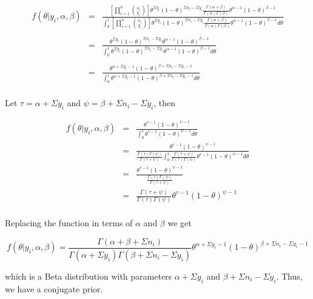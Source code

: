 \documentclass[12pt]{article}
\begin{document}
\begin{eqnarray*}
f(\theta|y_i,\alpha,\beta) &=& \frac{\left[\prod_{i=1}^n{n_i \choose y_i}\right]\theta^{\Sigma y_i}(1-\theta)^{\Sigma n_i-\Sigma y_i}\frac{\Gamma(\alpha+\beta)}{\Gamma(\alpha)\Gamma(\beta)}\theta^{\alpha-1}(1-\theta)^{\beta-1}}{\int_0^1\left[\prod_{i=1}^n{n_i \choose y_i}\right]\theta^{\Sigma y_i}(1-\theta)^{\Sigma n_i-\Sigma y_i}\frac{\Gamma(\alpha+\beta)}{\Gamma(\alpha)\Gamma(\beta)}\theta^{\alpha-1}(1-\theta)^{\beta-1}d\theta}  \\
\\
&=& \frac{\theta^{\Sigma y_i}(1-\theta)^{\Sigma n_i-\Sigma y_i}\theta^{\alpha-1}(1-\theta)^{\beta-1}}{\int_0^1\theta^{\Sigma y_i}(1-\theta)^{\Sigma n_i-\Sigma y_i}\theta^{\alpha-1}(1-\theta)^{\beta-1}d\theta} \\
\\
&=& \frac{\theta^{\alpha+\Sigma y_i-1}(1-\theta)^{\beta+\Sigma n_i-\Sigma y_i-1}}{\int_0^1\theta^{\alpha+\Sigma y_i-1}(1-\theta)^{\beta+\Sigma n_i-\Sigma y_i-1}d\theta} \\
\end{eqnarray*}

\noindent Let $\tau=\alpha+\Sigma y_i$ and $\psi=\beta+\Sigma n_i-\Sigma y_i$, then

\begin{eqnarray*}
f(\theta|y_i,\alpha,\beta) &=& \frac{\theta^{\tau-1}(1-\theta)^{\psi-1}}{\int_0^1\theta^{\tau-1}(1-\theta)^{\psi-1}d\theta} \\
&=& \frac{\theta^{\tau-1}(1-\theta)^{\psi-1}}{\frac{\Gamma(\tau)\Gamma(\psi)}{\Gamma(\tau+\psi)}\int_0^1\frac{\Gamma(\tau+\psi)}{\Gamma(\tau)\Gamma(\psi)}\theta^{\tau-1}(1-\theta)^{\psi-1}d\theta} \\
&=& \frac{\theta^{\tau-1}(1-\theta)^{\psi-1}}{\frac{\Gamma(\tau)\Gamma(\psi)}{\Gamma(\tau+\psi)}} \\
&=& \frac{\Gamma(\tau+\psi)}{\Gamma(\tau)\Gamma(\psi)}\theta^{\tau-1}(1-\theta)^{\psi-1} \\
\end{eqnarray*}

\noindent Replacing the function in terms of $\alpha$ and $\beta$ we get

\[f(\theta|y_i,\alpha,\beta)=\frac{\Gamma(\alpha+\beta+\Sigma n_i)}{\Gamma(\alpha+\Sigma y_i)\Gamma(\beta+\Sigma n_i-\Sigma y_i)}\theta^{\alpha+\Sigma y_i-1}(1-\theta)^{\beta+\Sigma n_i-\Sigma y_i-1}\]

\noindent which is a Beta distribution with parameters $\alpha+\Sigma y_i$ and $\beta+\Sigma n_i-\Sigma y_i$.  Thus, we have a conjugate prior.
\end{document}

